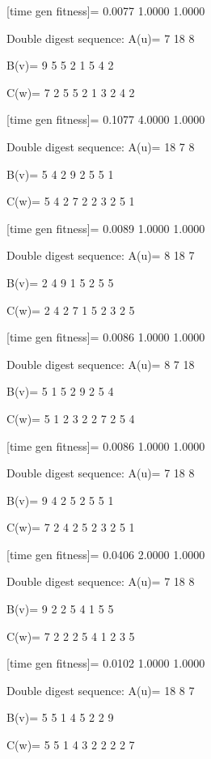 [time gen fitness]=
    0.0077    1.0000    1.0000

Double digest sequence:
A(u)=
     7    18     8

B(v)=
     9     5     5     2     1     5     4     2

C(w)=
     7     2     5     5     2     1     3     2     4     2

[time gen fitness]=
    0.1077    4.0000    1.0000

Double digest sequence:
A(u)=
    18     7     8

B(v)=
     5     4     2     9     2     5     5     1

C(w)=
     5     4     2     7     2     2     3     2     5     1

[time gen fitness]=
    0.0089    1.0000    1.0000

Double digest sequence:
A(u)=
     8    18     7

B(v)=
     2     4     9     1     5     2     5     5

C(w)=
     2     4     2     7     1     5     2     3     2     5

[time gen fitness]=
    0.0086    1.0000    1.0000

Double digest sequence:
A(u)=
     8     7    18

B(v)=
     5     1     5     2     9     2     5     4

C(w)=
     5     1     2     3     2     2     7     2     5     4

[time gen fitness]=
    0.0086    1.0000    1.0000

Double digest sequence:
A(u)=
     7    18     8

B(v)=
     9     4     2     5     2     5     5     1

C(w)=
     7     2     4     2     5     2     3     2     5     1

[time gen fitness]=
    0.0406    2.0000    1.0000

Double digest sequence:
A(u)=
     7    18     8

B(v)=
     9     2     2     5     4     1     5     5

C(w)=
     7     2     2     2     5     4     1     2     3     5

[time gen fitness]=
    0.0102    1.0000    1.0000

Double digest sequence:
A(u)=
    18     8     7

B(v)=
     5     5     1     4     5     2     2     9

C(w)=
     5     5     1     4     3     2     2     2     2     7

